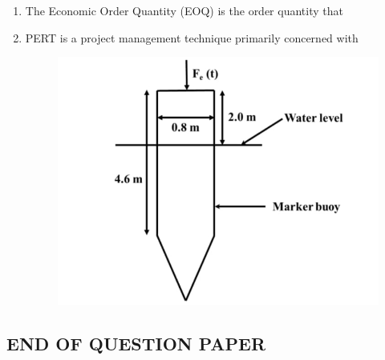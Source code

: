 \documentclass[journal,12pt,onecolumn]{IEEEtran}
\theoremstyle{remark}
\begin{document}
\begin{enumerate}
\item The Economic Order Quantity (EOQ) is the order quantity that\hfill{}

\begin{enumerate}[label=\Alph*.]
\end{enumerate}

\item PERT is a project management technique primarily concerned with\hfill{}

\begin{figure}[H]
    \centering
    \includegraphics[scale=0.35]{figs/q65.jpg}
    \caption{}
    \label{fig:figure1}
\end{figure}

\begin{enumerate}[label=\Alph*.]
\end{enumerate}


\end{enumerate}

\begin{center}
\section*{END OF QUESTION PAPER}
\end{center}
\end{document}

